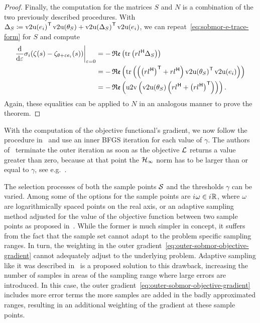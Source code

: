 \begin{proof}
    Finally, the computation for the matrices $S$ and $N$ is a combination of the two previously described procedures.
    With $\Delta_S \coloneqq {\mathop{}\!\mathrm{v}2\mathrm{u}(e_i)}^{\mkern1mu \mathsf{T}} \mathop{}\!\mathrm{v}2\mathrm{u}(\theta_S) + {\mathop{}\!\mathrm{v}2\mathrm{u}(\Delta_S)}^{\mkern1mu \mathsf{T}} \mathop{}\!\mathrm{v}2\mathrm{u}(e_i)$, we can repeat~\eqref{eq:sobmor-e-trace-form} for $S$ and compute
    \begin{equation*}
        \begin{aligned}
            \res{\frac{\dif}{\dif \varepsilon} \sigma_i(\tfunc(s) - \tfunc_{\theta + \varepsilon e_i}(s))}{\varepsilon = 0} &= - \re{\trace{r l\herm \Delta_S}} \\
            &= - \re{\trace{\left( {\left( r l\herm \right)}\trans + r l\herm \right) {\vecupper(\theta_S)}\trans \vecupper(e_i)}} \\
            &= - \re{\uppervec\left( \vecupper(\theta_S) \left( r l\herm + {\left( r l\herm \right)}\trans \right) \right)}.
        \end{aligned}
    \end{equation*}
    Again, these equalities can be applied to $N$ in an analogous manner to prove the theorem.
\end{proof}

With the computation of the objective functional's gradient, we now follow the procedure in~\cite{SV2023} and use an inner \ac{BFGS} iteration for each value of $\gamma$.
The authors of~\cite{SV2023} terminate the outer iteration as soon as the objective $\mathcal{L}$ returns a value greater than zero, because at that point the $\mathcal{H}_\infty$ norm has to be larger than or equal to $\gamma$, see e.g.~\cite[Section~3.2.2]{SV2023}.

The selection processes of both the sample points $\mathcal{S}$ and the thresholds $\gamma$ can be varied.
Among some of the options for the sample points are ${i\mkern1mu} \omega \in {i\mkern1mu} \mathbb{R}$, where $\omega$ are logarithmically spaced points on the real axis, or an adaptive sampling method adjusted for the value of the objective function between two sample points as proposed in~\cite{SV2021}.
While the former is much simpler in concept, it suffers from the fact that the sample set cannot adapt to the problem specific sampling ranges.
In turn, the weighting in the outer gradient~\eqref{eq:outer-sobmor-objective-gradient} cannot adequately adjust to the underlying problem.
Adaptive sampling like it was described in~\cite{SV2021} is a proposed solution to this drawback, increasing the number of samples in areas of the sampling range where large errors are introduced.
In this case, the outer gradient~\eqref{eq:outer-sobmor-objective-gradient} includes more error terms the more samples are added in the badly approximated ranges, resulting in an additional weighting of the gradient at these sample points.

\vspace{3em}

